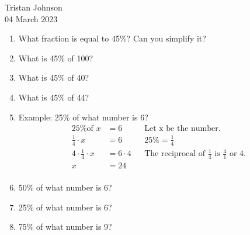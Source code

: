 \documentclass[14pt]{extarticle} %
\begin{document}
\hfill Tristan Johnson\\
\null\hfill 04 March 2023

\vspace{10mm}

\begin{enumerate}[label=\Alph*.), itemsep=\fill]
    \item What fraction is equal to 45\%? Can you simplify it?
    \item What is 45\% of 100?
    \item What is 45\% of 40?
    \item What is 45\% of 44?
\vfill\clearpage
    \item Example: 25\% of what number is 6?
        \begin{align*} 
            \text{25\% of } x &= 6 && \text{Let x be the number.}\\[1em]
            \frac{1}{4} \cdot x &= 6 && 25\% = \frac{1}{4}\\[1em]
            4 \cdot \frac{1}{4} \cdot x &= 6 \cdot 4 && \text{The reciprocal of $\frac{1}{4}$ is $\frac{4}{1}$ or 4.}\\[1em]
            x &= 24\\[1em]
        \end{align*}
    \item 50\% of what number is 6?
    \item 25\% of what number is 6?
    \item 75\% of what number is 9?
\vfill\end{enumerate}
\end{document}
